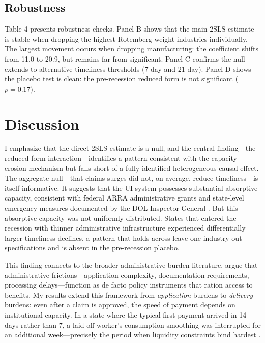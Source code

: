 \documentclass[12pt]{article}
\begin{document}
\subsection{Robustness}



Table 4 presents robustness checks. Panel B shows that the main 2SLS estimate is stable when dropping the highest-Rotemberg-weight industries individually. The largest movement occurs when dropping manufacturing: the coefficient shifts from 11.0 to 20.9, but remains far from significant. Panel C confirms the null extends to alternative timeliness thresholds (7-day and 21-day). Panel D shows the placebo test is clean: the pre-recession reduced form is not significant ($p = 0.17$).

\section{Discussion}

I emphasize that the direct 2SLS estimate is a null, and the central finding---the reduced-form interaction---identifies a pattern consistent with the capacity erosion mechanism but falls short of a fully identified heterogeneous causal effect. The aggregate null---that claims surges did not, on average, reduce timeliness---is itself informative. It suggests that the UI system possesses substantial absorptive capacity, consistent with federal ARRA administrative grants and state-level emergency measures documented by the DOL Inspector General \citep{oig2012}. But this absorptive capacity was not uniformly distributed. States that entered the recession with thinner administrative infrastructure experienced differentially larger timeliness declines, a pattern that holds across leave-one-industry-out specifications and is absent in the pre-recession placebo.

This finding connects to the broader administrative burden literature. \citet{herd2018} argue that administrative frictions---application complexity, documentation requirements, processing delays---function as de facto policy instruments that ration access to benefits. My results extend this framework from \emph{application} burdens to \emph{delivery} burdens: even after a claim is approved, the speed of payment depends on institutional capacity. In a state where the typical first payment arrived in 14 days rather than 7, a laid-off worker's consumption smoothing was interrupted for an additional week---precisely the period when liquidity constraints bind hardest \citep{ganong2019, chetty2008}.
\end{document}

